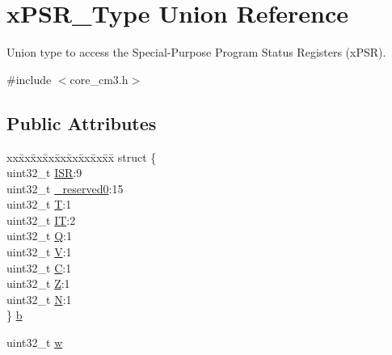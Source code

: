 \hypertarget{unionx_p_s_r___type}{\section{x\-P\-S\-R\-\_\-\-Type \-Union \-Reference}
\label{unionx_p_s_r___type}
}


\-Union type to access the \-Special-\/\-Purpose \-Program \-Status \-Registers (x\-P\-S\-R).  




{\ttfamily \#include $<$core\-\_\-cm3.\-h$>$}

\subsection*{\-Public \-Attributes}
\begin{DoxyCompactItemize}
\item 
\begin{tabbing}
xx\=xx\=xx\=xx\=xx\=xx\=xx\=xx\=xx\=\kill
struct \{\\
\>uint32\_t \hyperlink{unionx_p_s_r___type_a3e9120dcf1a829fc8d2302b4d0673970}{ISR}:9\\
\>uint32\_t \hyperlink{unionx_p_s_r___type_af438e0f407357e914a70b5bd4d6a97c5}{\_reserved0}:15\\
\>uint32\_t \hyperlink{unionx_p_s_r___type_a7eed9fe24ae8d354cd76ae1c1110a658}{T}:1\\
\>uint32\_t \hyperlink{unionx_p_s_r___type_a3200966922a194d84425e2807a7f1328}{IT}:2\\
\>uint32\_t \hyperlink{unionx_p_s_r___type_add7cbd2b0abd8954d62cd7831796ac7c}{Q}:1\\
\>uint32\_t \hyperlink{unionx_p_s_r___type_af14df16ea0690070c45b95f2116b7a0a}{V}:1\\
\>uint32\_t \hyperlink{unionx_p_s_r___type_a40213a6b5620410cac83b0d89564609d}{C}:1\\
\>uint32\_t \hyperlink{unionx_p_s_r___type_a1e5d9801013d5146f2e02d9b7b3da562}{Z}:1\\
\>uint32\_t \hyperlink{unionx_p_s_r___type_a2db9a52f6d42809627d1a7a607c5dbc5}{N}:1\\
\} \hyperlink{unionx_p_s_r___type_a3b1063bb5cdad67e037cba993b693b70}{b}\\

\end{tabbing}\item 
uint32\-\_\-t \hyperlink{unionx_p_s_r___type_a1a47176768f45f79076c4f5b1b534bc2}{w}
\end{DoxyCompactItemize}


